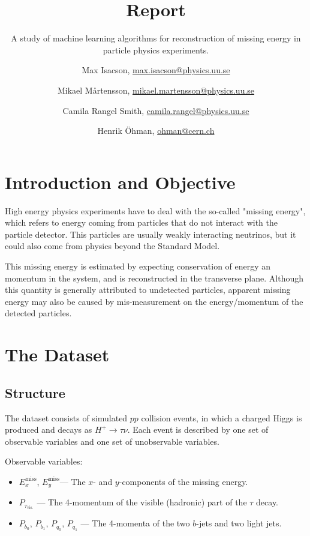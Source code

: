 \documentclass{scrartcl}
\title{Report}
\subtitle{A study of machine learning algorithms for reconstruction of missing energy in particle physics experiments.}
\author{
  Max Isacson, \url{max.isacson@physics.uu.se}
  \and
  Mikael M\aa rtensson, \url{mikael.martensson@physics.uu.se}
  \and
  Camila Rangel Smith, \url{camila.rangel@physics.uu.se}
  \and
  Henrik Öhman, \url{ohman@cern.ch}
}
\newcommand{\exmiss}{$E_x^\text{miss}$}
\newcommand{\eymiss}{$E_y^\text{miss}$}
\begin{document}
\maketitle


\section{Introduction and Objective}

High energy physics experiments have to deal with the so-called "missing energy", which refers to energy coming from particles that do not interact with the particle detector. This particles are usually weakly interacting neutrinos, but it could also come from physics beyond the Standard Model.

This missing energy is estimated by expecting conservation of energy an momentum in the system, and is reconstructed in the transverse plane.  Although this quantity is generally attributed to undetected particles, apparent missing energy may also be caused by mis-measurement on the energy/momentum of the detected particles.

\section{The Dataset}
\subsection{Structure}
The dataset consists of simulated $pp$ collision events, in which a charged Higgs is produced and decays as $H^+\to\tau\nu$. Each event is described by one set of observable variables and one set of unobservable variables.

Observable variables:
\begin{itemize}
    \item \exmiss, \eymiss --- The $x$- and $y$-components of the missing energy.
    \item $P_{\tau_\mathrm{vis.}}$ --- The 4-momentum of the visible (hadronic) part of the $\tau$ decay.
    \item $P_{b_0}$, $P_{b_1}$, $P_{q_0}$, $P_{q_1}$ --- The 4-momenta of the two $b$-jets and two light jets.
\end{itemize}
\end{document}
